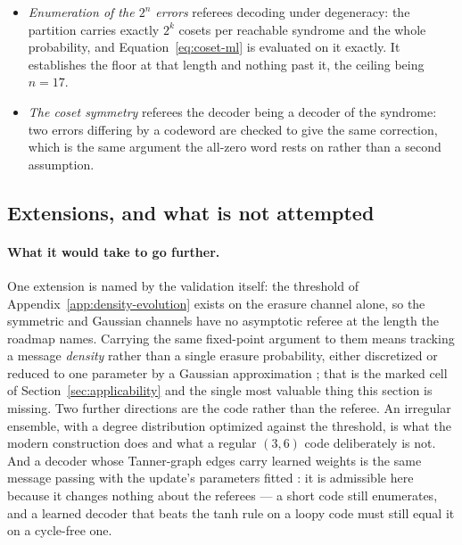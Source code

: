 \documentclass[11pt,a4paper]{article}
\begin{document}
\begin{itemize}
    then pinned a second way, against a label map built from a different
    computation, over every word of $\ker \parity$ at the enumerable instance.
    It establishes that the quotient is the one Equation~\ref{eq:coset-ml} is
    written in, which every number below depends on and none of which would
    visibly break if it were wrong.
  \item \emph{Enumeration of the $2^n$ errors} referees decoding under
    degeneracy: the partition carries exactly $2^k$ cosets per reachable
    syndrome and the whole probability, and Equation~\ref{eq:coset-ml} is
    evaluated on it exactly. It establishes the floor at that length and
    nothing past it, the ceiling being $n = 17$.
  \item \emph{The coset symmetry} referees the decoder being a decoder of the
    syndrome: two errors differing by a codeword are checked to give the same
    correction, which is the same argument the all-zero word rests on rather
    than a second assumption.
\end{itemize}

\subsection{Extensions, and what is not attempted}
\label{sec:ldpc:extensions}
\paragraph{What it would take to go further.}
One extension is named by the validation itself: the threshold of
Appendix~\ref{app:density-evolution} exists on the erasure channel alone, so
the symmetric and Gaussian channels have no asymptotic referee at the length
the roadmap names. Carrying the same fixed-point argument to them means
tracking a message \emph{density} rather than a single erasure probability,
either discretized or reduced to one parameter by a Gaussian approximation
\citep{richardson2008}; that is the marked cell of
Section~\ref{sec:applicability} and the single most valuable thing this
section is missing. Two further directions are the code rather than the
referee. An irregular ensemble, with a degree distribution optimized against
the threshold, is what the modern construction does and what a regular
$(3,6)$ code deliberately is not. And a decoder whose Tanner-graph edges
carry learned weights is the same message passing with the update's
parameters fitted \citep{nachmani2018}: it is admissible here because it
changes nothing about the referees --- a short code still enumerates, and a
learned decoder that beats the tanh rule on a loopy code must still equal it
on a cycle-free one.
\end{document}

